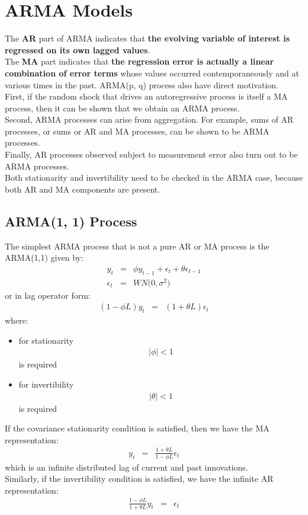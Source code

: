 \chapter{ARMA Models}
The \textbf{\color{blue}AR} part of ARMA indicates that \textbf{\color{blue}the evolving variable of interest is regressed on its own lagged values}.\\
The \textbf{\color{blue}MA} part indicates that \textbf{\color{blue}the regression error is actually a linear combination of error terms} whose values occurred contemporaneously and at various times in the past. 
ARMA(p, q) process also have direct motivation.\\
First, if the random shock that drives an autoregressive process is itself a MA process, then it can be shown that we obtain an ARMA process.\\
Second, ARMA processes can arise from aggregation. For example, sums of AR processes, or sums or AR and MA processes, can be shown to be ARMA processes.\\
Finally, AR processes observed subject to measurement error also turn out to be ARMA processes.\\
Both stationarity and invertibility need to be checked in the ARMA case, because both AR and MA components are present.

\section{ARMA(1, 1) Process}
The simplest ARMA process that is not a pure AR or MA process is the ARMA(1,1) given by:
\begin{eqnarray}
	y_{t} &=& \phi y_{t - 1} + \epsilon_{t} + \theta \epsilon_{t - 1}\\
	\epsilon_{t} &=& WN\Big(0, \sigma^{2}\Big)
\end{eqnarray}
or in lag operator form:
\begin{eqnarray}
	(1 - \phi L)y_{t} &=& (1 + \theta L)\epsilon_{t}
\end{eqnarray}
where:
\begin{itemize}
	\item for stationarity
	\begin{eqnarray}
		\vert\phi\vert < 1
	\end{eqnarray}
	is required
	\item for invertibility
	\begin{eqnarray}
		\vert\theta\vert < 1
	\end{eqnarray}
	is required
\end{itemize}
If the covariance stationarity condition is satisfied, then we have the MA representation:
\begin{eqnarray}
	y_{t} &=& \frac{1 + \theta L}{1 - \phi L}\epsilon_{t}
\end{eqnarray}
which is an infinite distributed lag of current and past innovations.\\
Similarly, if the invertibility condition is satisfied, we have the infinite AR representation:
\begin{eqnarray}
\frac{1 - \phi L}{1 + \theta L}y_{t} &=& \epsilon_{t}	
\end{eqnarray}

